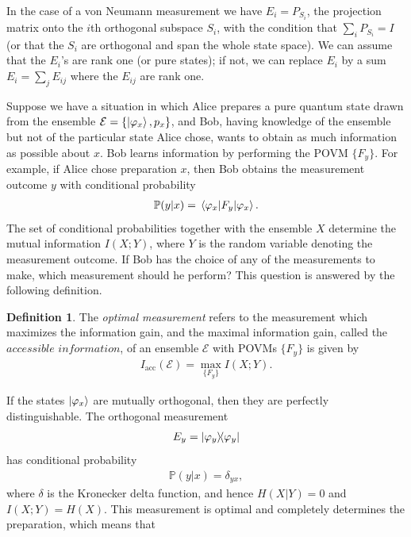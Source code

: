 \documentclass[a4paper, 12pt]{article}
\numberwithin{equation}{section}
\numberwithin{figure}{section}
\theoremstyle{definition}
\newtheorem{definition}{Definition}[section]
\begin{document}
    In the case of a von Neumann measurement we have $E_i = P_{S_i}$, the projection matrix onto the $i$th orthogonal subspace $S_i$, with the condition that $\sum_i P_{S_i} = I$ (or that the $S_i$ are orthogonal and span the whole state space). We can assume that the $E_i$'s are rank one (or pure states); if not, we can replace $E_i$ by a sum $E_i = \sum_j E_{ij}$ where the $E_{ij}$ are rank one. \par
    Suppose we have a situation in which Alice prepares a pure quantum state drawn from the ensemble $\mathcal{E} = \{ \ket{\varphi_x}, p_x \}$, and Bob, having knowledge of the ensemble but not of the particular state Alice chose, wants to obtain as much information as possible about $x$. Bob learns information by performing the POVM $\{ F_y \}$. For example, if Alice chose preparation $x$, then Bob obtains the measurement outcome $y$ with conditional probability
    \begin{align}
        \mathbb{P}(y | x) = \matrixel{\varphi_x}{F_y}{\varphi_x}.
    \end{align}
    The set of conditional probabilities together with the ensemble $X$ determine the mutual information $I(X; Y)$, where $Y$ is the random variable denoting the measurement outcome. If Bob has the choice of any of the measurements to make, which measurement should he perform? This question is answered by the following definition.
    \begin{definition}
        The \textit{optimal measurement} refers to the measurement which maximizes the information gain, and the maximal information gain, called the $\textit{accessible information}$, of an ensemble $\mathcal{E}$ with POVMs $\{ F_y \}$ is given by
        \begin{align}
            I_\text{acc}(\mathcal{E}) = \max_{\{ F_y \}} I(X; Y).
        \end{align}
    \end{definition}
    If the states $\ket{\varphi_x}$ are mutually orthogonal, then they are perfectly distinguishable. The orthogonal measurement
    \begin{align}
        E_y = \dyad{\varphi_y}{\varphi_y}
    \end{align}
    has conditional probability
    \begin{align}
        \mathbb{P}(y | x) = \delta_{yx},
    \end{align}
    where $\delta$ is the Kronecker delta function, and hence $H(X | Y) = 0$ and $I(X; Y) = H(X)$. This measurement is optimal and completely determines the preparation, which means that
\end{document}
